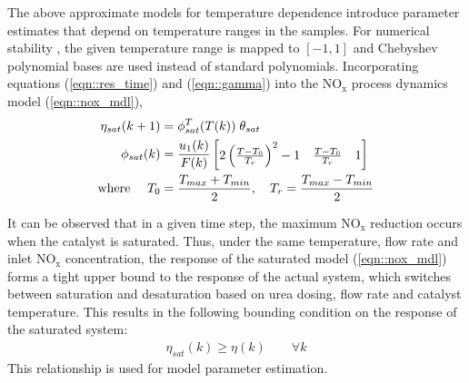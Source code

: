 \documentclass[subscriptcorrection,upint,varvw,barcolor=Goldenrod3,mathalfa=cal=euler,balance,hyphenate,french,pdf-a]{asmejour}
\renewcommand{\bm}[1]{\begin{bmatrix} #1 \end{bmatrix}}
\newcommand{\lr}[1]{\left( #1 \right)}
\newcommand{\nox}{\text{NO}_{\text{x}}}
\begin{document}
The above approximate models for temperature dependence introduce parameter estimates that depend on temperature ranges
in the samples. For numerical stability \cite{press2003numerical}, the given temperature range is mapped to $[-1,1]$ and
Chebyshev polynomial bases \cite{trefethen2019approximation} are used instead of standard polynomials. Incorporating
equations (\ref{eqn::res_time}) and (\ref{eqn::gamma}) into the $\nox$ process dynamics model (\ref{eqn::nox_mdl}),
\begin{align}
        \eta_{sat} (k+1)        & = \phi_{sat}^T(T(k)) \; \theta_{sat}
        \label{eqn::regression}                                                                                                          \\
        \phi_{sat} (k)          & = \frac{u_1(k)}{F(k)} \bm{2\lr{\frac{T-T_0}{T_r}}^2-1                         & \frac{T-T_0}{T_r} & 1}
        \label{eqn::phi_def}                                                                                                             \\
        \text{where } \quad T_0 & = \frac{T_{max} + T_{min}}{2}, \quad T_r = \frac{T_{max} - T_{min}}{2} \notag
\end{align}

It can be observed that in a given time step, the maximum $\nox$ reduction occurs when the catalyst is saturated. Thus,
under the same temperature, flow rate and inlet $\nox$ concentration, the response of the saturated model
(\ref{eqn::nox_mdl}) forms a tight upper bound to the response of the actual system, which switches between saturation
and desaturation based on urea dosing, flow rate and catalyst temperature. This results in the following bounding
condition on the response of the saturated system:
\begin{align}
        \eta_{sat}(k) \geq \eta(k) \qquad \forall k
        \label{eqn::eta_bound}
\end{align}
This relationship is used for model parameter estimation.
\end{document}
